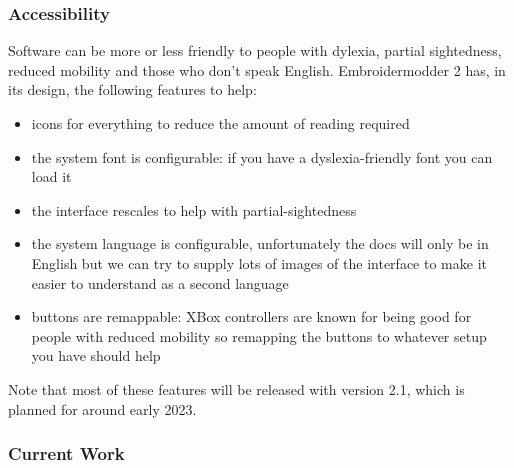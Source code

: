 \documentclass[a4paper, 11pt]{report}
\begin{document}
\subsubsection{Accessibility}

Software can be more or less friendly to people with dylexia, partial sightedness,
reduced mobility and those who don't speak English.
Embroidermodder 2 has, in its design, the following features to help:

\begin{itemize}
\item icons for everything to reduce the amount of reading required
\item the system font is configurable: if you have a dyslexia-friendly font you can load it
\item the interface rescales to help with partial-sightedness
\item the system language is configurable, unfortunately the docs will only be in English but we can try to supply lots of images of the interface to make it easier to understand as a second language
\item buttons are remappable: XBox controllers are known for being good for people with reduced mobility so remapping the buttons to whatever setup you have should help
\end{itemize}

Note that most of these features will be released with version 2.1, which is planned for around early 2023.

\subsubsection{Current Work}
\end{document}
